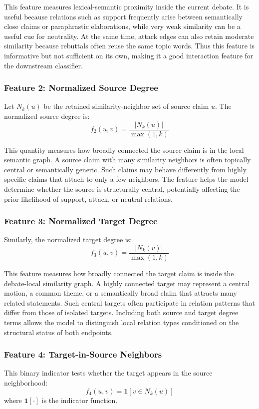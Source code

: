 \documentclass[11pt,a4paper]{article}
\begin{document}
This feature measures lexical-semantic proximity inside the current debate. It is useful because relations such as support frequently arise between semantically close claims or paraphrastic elaborations, while very weak similarity can be a useful cue for neutrality. At the same time, attack edges can also retain moderate similarity because rebuttals often reuse the same topic words. Thus this feature is informative but not sufficient on its own, making it a good interaction feature for the downstream classifier.

\subsubsection{Feature 2: Normalized Source Degree}
Let \(N_k(u)\) be the retained similarity-neighbor set of source claim \(u\). The normalized source degree is:
\begin{equation}
f_2(u,v) = \frac{|N_k(u)|}{\max(1,k)}
\end{equation}

This quantity measures how broadly connected the source claim is in the local semantic graph. A source claim with many similarity neighbors is often topically central or semantically generic. Such claims may behave differently from highly specific claims that attach to only a few neighbors. The feature helps the model determine whether the source is structurally central, potentially affecting the prior likelihood of support, attack, or neutral relations.

\subsubsection{Feature 3: Normalized Target Degree}
Similarly, the normalized target degree is:
\begin{equation}
f_3(u,v) = \frac{|N_k(v)|}{\max(1,k)}
\end{equation}

This feature measures how broadly connected the target claim is inside the debate-local similarity graph. A highly connected target may represent a central motion, a common theme, or a semantically broad claim that attracts many related statements. Such central targets often participate in relation patterns that differ from those of isolated targets. Including both source and target degree terms allows the model to distinguish local relation types conditioned on the structural status of both endpoints.

\subsubsection{Feature 4: Target-in-Source Neighbors}
This binary indicator tests whether the target appears in the source neighborhood:
\begin{equation}
f_4(u,v) =
\mathbf{1}[v \in N_k(u)]
\end{equation}
where \(\mathbf{1}[\cdot]\) is the indicator function.
\end{document}
